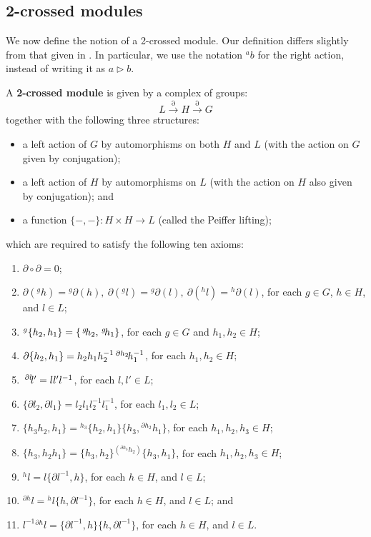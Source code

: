 \documentclass{tac}
\newcommand{\act}[1]{\,\sp{#1}\!}
\newcommand{\del}{\partial}
\begin{document}
\subsection{2-crossed modules}

We now define the notion of a 2-crossed module. Our definition differs slightly from that given in \cite{MartinsPicken2011}. In particular, we use the notation ${}^a b$ for the right action, instead of writing it as  $a \triangleright b$.


A \textbf{2-crossed module} is given by a complex of groups:
\[
L \xrightarrow{\partial} H \xrightarrow{\partial} G 
\]
together with the following three structures:
\begin{itemize}
  \item a left action of $G$ by automorphisms on both $H$ and $L$ (with the action on $G$ given by conjugation);
  \item a left action of $H$ by automorphisms on $L$ (with the action on $H$ also given by conjugation); and
  \item a function $\{-,-\} : H \times H \rightarrow L$ (called the Peiffer lifting);
\end{itemize}
which are required to satisfy the following ten axioms:
\begin{enumerate}
  \item  $\partial\circ \partial =0$;
  \item  $\partial(^gh)= {^g}\partial(h),\ \partial({^g}l)= {^g}\partial(l),\ \partial(^hl)= {^h}\partial(l)$, for each $g \in G$, $h \in H$, and $l \in L$;
  \item  $^g \{h_2,h_1\} = \{\act{g} h_2, \act{g}h_1\}$, for each $g\in G$ and $h_1,h_2 \in H$;
  \label{pfeq}
  \item $\partial  \{h_2, h_1\} = h_2 h_1 h_2^{-1} \act{\partial h_2}h_1^{-1}$, for each $h_1,h_2 \in H$;
  \item $\act{\del l}l' = l l' l^{-1}$, for each $l,l' \in L$;
\label{2cm_pf_id}
  \item $\{\partial l_2,\partial l_1\} = l_2l_1l_2^{-1}l_1^{-1}$, for each $l_1,l_2 \in L$;
\label{2cm_not_need_pl}
  \item $\{h_3h_2,h_1\}={^{h_3}}\{h_2, h_1\}\{h_3, {^{\partial h_2}}h_1 \}$, for each $h_1,h_2, h_3 \in H$;
  \label{lpl}
  \item $\{h_3,h_2 h_1\}=\{h_3, h_2\} {^{(^{\partial h_3} h_2)}}\{h_3, h_1\}$, for each $h_1,h_2, h_3 \in H$;
  \label{rpl}
  \item ${^h}l = l\{\partial l^{-1}, h \}$, for each $h \in H$, and $l\in L$;
  \label{acthl}
  \item ${^{\partial h}}l = {^h}l\{h, \partial l^{-1} \}$, for each $h\in H$, and $l \in L$; and
  \label{actgl}
  \item $l^{-1} {^{\partial h}}l=\{\partial l^{-1}, h \}\{h, \partial l^{-1} \}$, for each $h \in H$, and $l \in L$.
  \label{2cm_not_need}
\end{enumerate}
\end{document}
